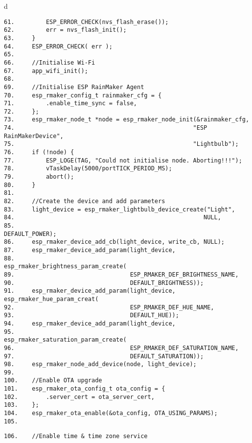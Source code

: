 \documentclass[a4paper,12pt]{book}
\begin{document}
\begin{codebloc}
\begin{tabular}{d}
\vspace{2pt}
\begin{verbatim}
61.         ESP_ERROR_CHECK(nvs_flash_erase());
62.         err = nvs_flash_init();
63.     }
64.     ESP_ERROR_CHECK( err );
65.	
66.     //Initialise Wi-Fi
67.     app_wifi_init();
68.	
69.     //Initialise ESP RainMaker Agent
70.     esp_rmaker_config_t rainmaker_cfg = {
71.         .enable_time_sync = false,
72.     };
73.     esp_rmaker_node_t *node = esp_rmaker_node_init(&rainmaker_cfg,
74.                                                   "ESP RainMakerDevice", 
75.                                                   "Lightbulb");
76.     if (!node) {
77.         ESP_LOGE(TAG, "Could not initialise node. Aborting!!!");
78.         vTaskDelay(5000/portTICK_PERIOD_MS);
79.         abort();
80.     }
81.	
82.     //Create the device and add parameters
83.     light_device = esp_rmaker_lightbulb_device_create("Light",
84.                                                      NULL,
85.                                                      DEFAULT_POWER);
86.     esp_rmaker_device_add_cb(light_device, write_cb, NULL);
87.     esp_rmaker_device_add_param(light_device,
88.                                 esp_rmaker_brightness_param_create(  
89.                                 ESP_RMAKER_DEF_BRIGHTNESS_NAME, 
90.                                 DEFAULT_BRIGHTNESS));
91.     esp_rmaker_device_add_param(light_device, esp_rmaker_hue_param_creat(
92.                                 ESP_RMAKER_DEF_HUE_NAME,  
93.                                 DEFAULT_HUE));
94.     esp_rmaker_device_add_param(light_device, 
95.                                 esp_rmaker_saturation_param_create( 
96.                                 ESP_RMAKER_DEF_SATURATION_NAME, 
97.                                 DEFAULT_SATURATION));
98.     esp_rmaker_node_add_device(node, light_device);
99.	
100.    //Enable OTA upgrade
101.    esp_rmaker_ota_config_t ota_config = {
102.        .server_cert = ota_server_cert,
103.    };
104.    esp_rmaker_ota_enable(&ota_config, OTA_USING_PARAMS);
105.
\end{verbatim}
\verb|106.    //Enable time & time zone service|
\end{tabular}
\end{codebloc}
\end{document}
